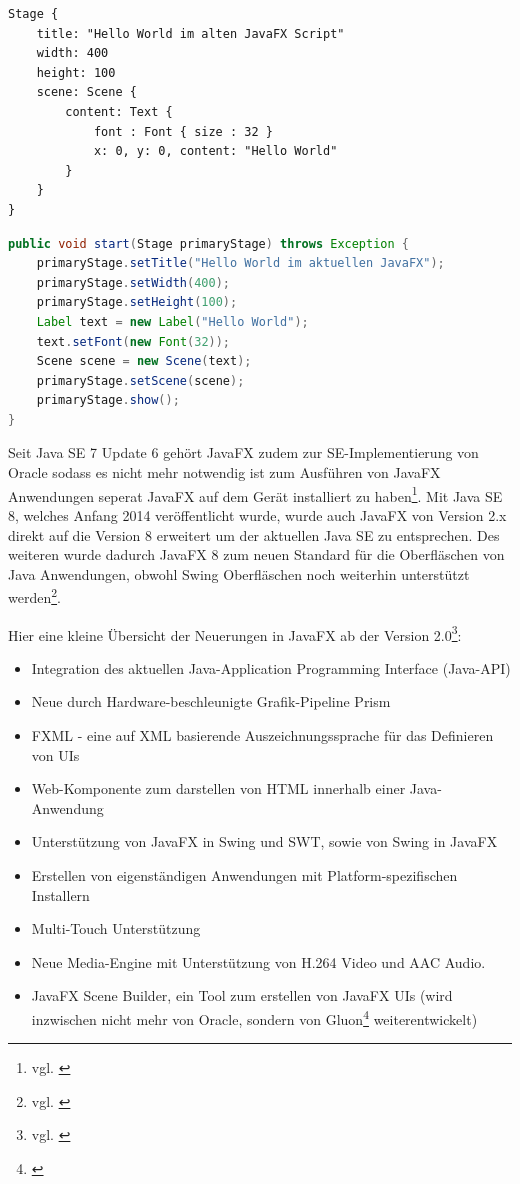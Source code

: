 \begin{lstlisting}[language=JavaFXScript, caption=Hello World in JavaFX Script (JavaFX 1.x), frame=single, label=lst:JavaFXScriptExample]
Stage {
    title: "Hello World im alten JavaFX Script"
    width: 400
    height: 100
    scene: Scene {
        content: Text {
            font : Font { size : 32 }
            x: 0, y: 0, content: "Hello World"
        }
    } 
}
\end{lstlisting}

\begin{lstlisting}[language=Java, caption=Hello World im neuen JavaFX (ab JavaFX 2.0), frame=single, label=lst:JavaFXExample]
public void start(Stage primaryStage) throws Exception {
    primaryStage.setTitle("Hello World im aktuellen JavaFX");
    primaryStage.setWidth(400);
    primaryStage.setHeight(100);
    Label text = new Label("Hello World");
    text.setFont(new Font(32));
    Scene scene = new Scene(text);
    primaryStage.setScene(scene);
    primaryStage.show();
}
\end{lstlisting}

Seit Java SE 7 Update 6 gehört JavaFX zudem zur SE-Implementierung von Oracle sodass es nicht mehr notwendig ist zum Ausführen von JavaFX Anwendungen seperat JavaFX auf dem Gerät installiert zu haben\footnote{vgl. \cite{javafxFAQ}}. Mit Java SE 8, welches Anfang 2014 veröffentlicht wurde, wurde auch JavaFX von Version 2.x direkt auf die Version 8 erweitert um der aktuellen Java SE zu entsprechen. Des weiteren wurde dadurch JavaFX 8 zum neuen Standard für die Oberfläschen von Java Anwendungen, obwohl Swing Oberfläschen noch weiterhin unterstützt werden\footnote{vgl. \cite{javafxFAQ2}}.

Hier eine kleine Übersicht der Neuerungen in JavaFX ab der Version 2.0\footnote{vgl. \cite{javafxFAQ2}}:
\begin{itemize}
	\item Integration des aktuellen Java-Application Programming Interface (Java-API)
	\item Neue durch Hardware-beschleunigte Grafik-Pipeline Prism
	\item FXML - eine auf XML basierende Auszeichnungssprache für das Definieren von UIs
	\item Web-Komponente zum darstellen von HTML innerhalb einer Java-Anwendung
	\item Unterstützung von JavaFX in Swing und SWT, sowie von Swing in JavaFX
	\item Erstellen von eigenständigen Anwendungen mit Platform-spezifischen Installern
	\item Multi-Touch Unterstützung
	\item Neue Media-Engine mit Unterstützung von H.264 Video und AAC Audio.
	\item JavaFX Scene Builder, ein Tool zum erstellen von JavaFX UIs (wird inzwischen nicht mehr von Oracle, sondern von Gluon\footnote{\cite{gluonscenebuilder}} weiterentwickelt)
\end{itemize}


